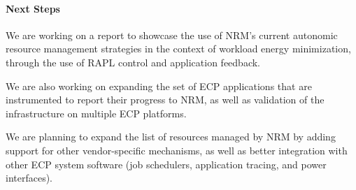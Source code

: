 \paragraph{Next Steps}

We are working on a report to showcase the use of NRM's current autonomic
resource management strategies in the context of workload energy minimization,
through the use of RAPL control and application feedback.

We are also working on expanding the set of ECP applications that are
instrumented to report their progress to NRM, as well as validation of the
infrastructure on multiple ECP platforms.

We are planning to expand the list of resources managed by NRM by
adding support for other vendor-specific mechanisms, as well as better
integration with other ECP system software (job schedulers, application
tracing, and power interfaces).
